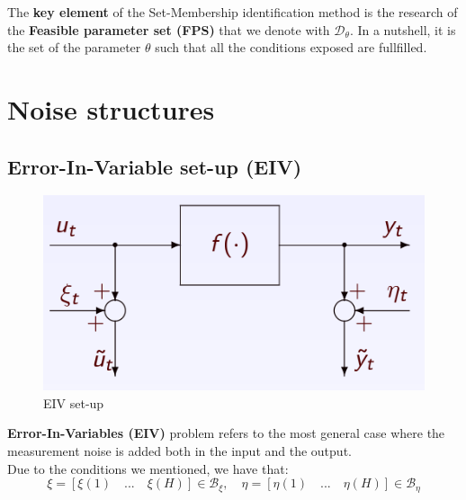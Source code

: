 The \textbf{key element} of the Set-Membership identification method is the research of the \textbf{Feasible parameter set (FPS)} that we denote with $\mathcal{D}_\theta$. In a nutshell, it is the set of the parameter $\theta$ such that all the conditions exposed are fullfilled.

\section{Noise structures}

\subsection{Error-In-Variable set-up (EIV)}
\begin{figure}[h]
    \centering 
    \includegraphics[scale=1]{images/EIV.png}
    \caption{EIV set-up}
\end{figure}
\textbf{Error-In-Variables (EIV)} problem refers to the most general case where the measurement noise is added both in the input and the output.\\
Due to the conditions we mentioned, we  have that:
{\large{
    \begin{equation*}
        \xi = [\xi(1) \quad ... \quad \xi(H)]\in \mathcal{B}_\xi, \quad
        \eta = [\eta(1) \quad ... \quad \eta(H)]\in \mathcal{B}_\eta
    \end{equation*}
}}

